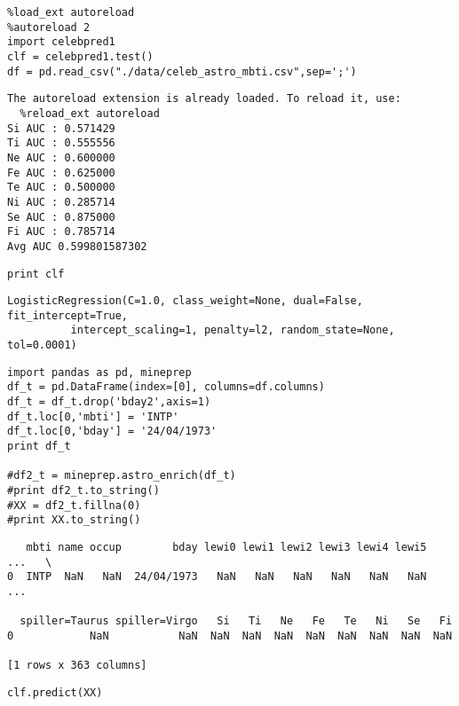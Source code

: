 \documentclass[12pt,fleqn]{article}\usepackage{../common}
\begin{document}
\begin{verbatim}
%load_ext autoreload
%autoreload 2
import celebpred1
clf = celebpred1.test()
df = pd.read_csv("./data/celeb_astro_mbti.csv",sep=';')
\end{verbatim}

\begin{verbatim}
The autoreload extension is already loaded. To reload it, use:
  %reload_ext autoreload
Si AUC : 0.571429
Ti AUC : 0.555556
Ne AUC : 0.600000
Fe AUC : 0.625000
Te AUC : 0.500000
Ni AUC : 0.285714
Se AUC : 0.875000
Fi AUC : 0.785714
Avg AUC 0.599801587302
\end{verbatim}

\begin{verbatim}
print clf
\end{verbatim}

\begin{verbatim}
LogisticRegression(C=1.0, class_weight=None, dual=False, fit_intercept=True,
          intercept_scaling=1, penalty=l2, random_state=None, tol=0.0001)
\end{verbatim}

\begin{verbatim}
import pandas as pd, mineprep
df_t = pd.DataFrame(index=[0], columns=df.columns)
df_t = df_t.drop('bday2',axis=1)
df_t.loc[0,'mbti'] = 'INTP'
df_t.loc[0,'bday'] = '24/04/1973'
print df_t

#df2_t = mineprep.astro_enrich(df_t)
#print df2_t.to_string()
#XX = df2_t.fillna(0)
#print XX.to_string()
\end{verbatim}

\begin{verbatim}
   mbti name occup        bday lewi0 lewi1 lewi2 lewi3 lewi4 lewi5  ...   \
0  INTP  NaN   NaN  24/04/1973   NaN   NaN   NaN   NaN   NaN   NaN  ...    

  spiller=Taurus spiller=Virgo   Si   Ti   Ne   Fe   Te   Ni   Se   Fi  
0            NaN           NaN  NaN  NaN  NaN  NaN  NaN  NaN  NaN  NaN  

[1 rows x 363 columns]
\end{verbatim}

\begin{verbatim}
clf.predict(XX)
\end{verbatim}
\end{document}
